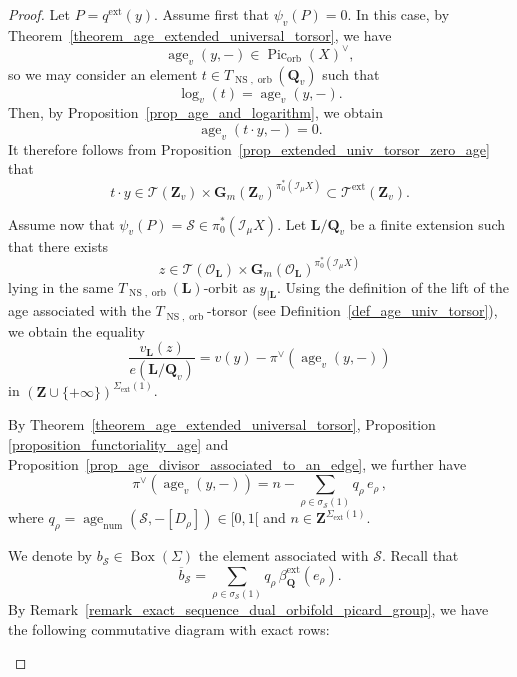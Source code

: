 \documentclass[10pt,a4paper]{amsart}
\DeclareMathOperator{\Boxe}{Box}
\newcommand{\G}{\mathbf{G}}
\newcommand{\Le}{\mathbf{L}}
\DeclareMathOperator{\NS}{NS}
\DeclareMathOperator{\Pic}{Pic}
\newcommand{\Q}{\mathbf{Q}}
\newcommand{\Z}{\mathbf{Z}}
\DeclareMathOperator{\age}{age}
\DeclareMathOperator{\ext}{ext}
\DeclareMathOperator{\num}{num}
\DeclareMathOperator{\orb}{orb}
\newcommand{\sheafI}{\mathcal{I}}
\newcommand{\sheafO}{\mathcal{O}}
\newcommand{\stackS}{\mathcal{S}}
\newcommand{\stackT}{\mathcal{T}}
\newcommand{\twistsector}{\pi_0^*(\sheafI_{\mu} X)}
\begin{document}
\begin{proof}
Let $P = q^{\ext}(y)$. Assume first that $\psi_v(P) = 0$. In this case, by Theorem~\ref{theorem_age_extended_universal_torsor}, we have
\[
\age_v(y,-) \in \Pic_{\orb}(X)^{\vee},
\]
so we may consider an element $t \in T_{\NS,\orb}(\Q_v)$ such that
\[
\log_v(t) = \age_v(y,-).
\]
Then, by Proposition~\ref{prop_age_and_logarithm}, we obtain
\[
\age_v(t \cdot y,-) = 0.
\]
It therefore follows from Proposition~\ref{prop_extended_univ_torsor_zero_age} that
\[
t \cdot y \in \stackT(\Z_v) \times \G_m(\Z_v)^{\twistsector} \subset \stackT^{\ext}(\Z_v).
\]

Assume now that $\psi_v(P) = \stackS \in \twistsector$. Let $\Le/\Q_v$ be a finite extension such that there exists
\[
z \in \stackT(\sheafO_{\Le}) \times \G_m(\sheafO_{\Le})^{\twistsector}
\]
lying in the same $T_{\NS,\orb}(\Le)$-orbit as $y_{|\Le}$. Using the definition of the lift of the age associated with the $T_{\NS,\orb}$-torsor (see Definition~\ref{def_age_univ_torsor}), we obtain the equality
\[
\frac{v_{\Le}(z)}{e(\Le/\Q_v)}
=
v(y) - \pi^{\vee}(\age_v(y,-)) 
\]
in $\left( \Z \cup \{+\infty\} \right)^{\Sigma_{\ext}(1)}$.

By
Theorem~\ref{theorem_age_extended_universal_torsor}, Proposition \ref{proposition_functoriality_age} and
Proposition~\ref{prop_age_divisor_associated_to_an_edge}, we further have
\begin{equation}\label{equation_computation_value_n}
\pi^{\vee}\!\left( \age_v(y,-) \right)
=
n - \sum_{\rho \in \sigma_\stackS(1)} q_{\rho}\, e_{\rho} \, ,   
\end{equation}where
$q_{\rho} = \age_{\num}\!\left(\stackS,-[D_{\rho}]\right) \in [0,1[$ and
$n \in \Z^{\Sigma_{\ext}(1)}$.

We denote by $b_{\stackS} \in \Boxe(\Sigma)$ the element associated with $\stackS$.
Recall that
\[
\overline b_{\stackS}
=
\sum_{\rho \in \sigma_\stackS(1)} q_{\rho}\, \beta^{\ext}_{\Q}(e_{\rho}).
\]
By Remark~\ref{remark_exact_sequence_dual_orbifold_picard_group}, we have the following
commutative diagram with exact rows:
\begin{center}
\end{center}


\end{proof}
\end{document}
